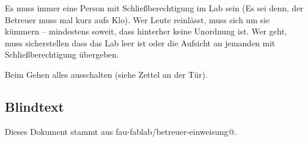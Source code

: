 \documentclass{\basedir/fablab-document}
\begin{document}
Es muss immer eine Person mit Schließberechtigung im Lab sein (Es sei denn, der Betreuer muss mal kurz aufs Klo). Wer Leute reinlässt, muss sich um sie kümmern -- mindestens soweit, dass hinterher keine Unordnung ist. Wer geht, muss sicherstellen dass das Lab leer ist oder die Aufsicht an jemanden mit Schließberechtigung übergeben.

Beim Gehen alles ausschalten (siehe Zettel an der Tür).

\subsection{Blindtext}
\blindtext


Dieses Dokument stammt aus fau-fablab/betreuer-einweisung@\Revision{}.
\end{document}
